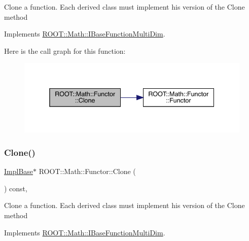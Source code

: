 Clone a function. Each derived class must implement his version of the Clone method 

Implements \mbox{\hyperlink{classROOT_1_1Math_1_1IBaseFunctionMultiDim_a57939204b1f525b43835b42e0635dd3b}{R\+O\+O\+T\+::\+Math\+::\+I\+Base\+Function\+Multi\+Dim}}.

Here is the call graph for this function\+:
\nopagebreak
\begin{figure}[H]
\begin{center}
\leavevmode
\includegraphics[width=338pt]{da/d8e/classROOT_1_1Math_1_1Functor_a989f9b6dd160ebe03911cdee00dacaad_cgraph}
\end{center}
\end{figure}
\mbox{\label{classROOT_1_1Math_1_1Functor_a989f9b6dd160ebe03911cdee00dacaad}} 
\subsubsection{\texorpdfstring{Clone()}{Clone()}\hspace{0.1cm}{\footnotesize\ttfamily [3/3]}}
{\footnotesize\ttfamily \mbox{\hyperlink{classROOT_1_1Math_1_1Functor_acc5dacb213f26296122e95138f5153b3}{Impl\+Base}}$\ast$ R\+O\+O\+T\+::\+Math\+::\+Functor\+::\+Clone (\begin{DoxyParamCaption}{ }\end{DoxyParamCaption}) const\hspace{0.3cm}{\ttfamily [inline]}, {\ttfamily [virtual]}}

Clone a function. Each derived class must implement his version of the Clone method 

Implements \mbox{\hyperlink{classROOT_1_1Math_1_1IBaseFunctionMultiDim_a57939204b1f525b43835b42e0635dd3b}{R\+O\+O\+T\+::\+Math\+::\+I\+Base\+Function\+Multi\+Dim}}.

